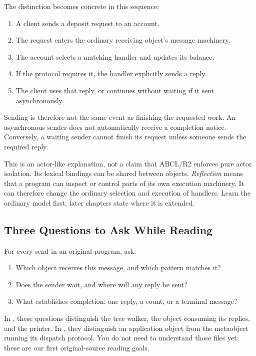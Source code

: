 The distinction becomes concrete in this sequence:
\begin{enumerate}[nosep]
  \item A client sends a deposit request to an account.
  \item The request enters the ordinary receiving object's message machinery.
  \item The account selects a matching handler and updates its balance.
  \item If the protocol requires it, the handler explicitly sends a reply.
  \item The client uses that reply, or continues without waiting if it sent
        asynchronously.
\end{enumerate}
Sending is therefore not the same event as finishing the requested work.
An asynchronous sender does not automatically receive a completion notice.
Conversely, a waiting sender cannot finish its request unless someone
sends the required reply.

This is an actor-like explanation, not a claim that ABCL/R2 enforces pure
actor isolation. Its lexical bindings can be shared between objects.
\emph{Reflection} means that a program can inspect or control parts of
its own execution machinery. It can therefore change the ordinary
selection and execution of handlers.
Learn the ordinary model first; later chapters state where it is extended.

\subsection{Three Questions to Ask While Reading}

For every send in an original program, ask:
\begin{enumerate}[nosep]
  \item Which object receives this message, and which pattern matches it?
  \item Does the sender wait, and where will any reply be sent?
  \item What establishes completion: one reply, a count, or a terminal message?
\end{enumerate}
In , these questions distinguish
the tree walker, the object consuming its replies, and the printer.
In , they distinguish an application
object from the metaobject running its dispatch protocol.
You do not need to understand those files yet; these are our first
original-source reading goals.

